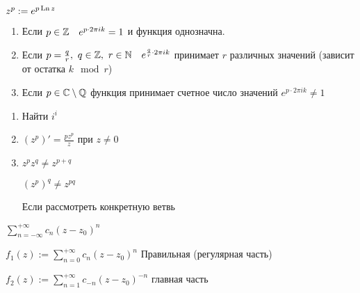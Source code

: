 
\begin{definition}\thmslashn
	
	$z^p := e^{p \operatorname{Ln} z}$
	
\end{definition}

\begin{remarks}\thmslashn

	\begin{enumerate}
		\item 
		Если $p \in \mathbb{Z} \quad e^{p\cdot 2\pi i k} = 1$ и функция однозначна.
		
		\item 
		Если $p = \frac{q}{r}, \,\, q\in\mathbb{Z},\,\,r\in\mathbb{N} \quad e^{\frac{q}{r}\cdot 2\pi i k}$ принимает $r$ различных значений (зависит от остатка $k \mod r$)
		
		\item
		Если $p\in \mathbb{C}\setminus \mathbb{Q}$ функция принимает счетное число значений $e^{p\cdot 2\pi i k} \not = 1$
	\end{enumerate}
	
\end{remarks}

\begin{exerc}\thmslashn
	
	\begin{enumerate}
		\item 
		Найти $i^i$
		
		\item
		$(z^p)' = \frac{pz^p}{z}$ при $z \not = 0$
		
		\item
		$z^pz^q \not = z^{p+q}$
		
		$(z^p)^q \not = z^{pq}$
		
		Если рассмотреть конкретную ветвь
	\end{enumerate}
	
\end{exerc}

\begin{definition}\thmslashn
	
	$\sum\limits_{n=-\infty}^{+\infty} c_n(z-z_0)^n$
	
	$f_1(z) := \sum\limits_{n=0}^{+\infty} c_n(z-z_0)^n$ Правильная (регулярная часть)
	
	$f_2(z) := \sum\limits_{n=1}^{+\infty} c_{-n}(z-z_0)^{-n}$ главная часть
	
\end{definition}

